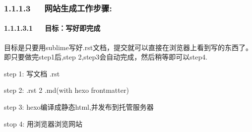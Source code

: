 \documentclass[letterpaper,12pt,english]{sphinxmanual}
\begin{document}
\subsubsection{1.1.1.3   网站生成工作步骤:}
\label{\detokenize{001software/001install/001._u7f51_u7ad9/gitpage:id5}}

\paragraph{1.1.1.3.1   目标：写好即完成}
\label{\detokenize{001software/001install/001._u7f51_u7ad9/gitpage:id6}}
目标是只要用sublime写好.rst文档，提交就可以直接在浏览器上看到写的东西了。即只要做完step1后,step 2,step3会自动完成，然后稍等即可以step4.

\begin{DUlineblock}{0em}
\item[] step 1: 写文档 .rst
\item[] step 2: .rst 2 .md(with hexo frontmatter)
\item[] step 3: hexo编译成静态html,并发布到托管服务器
\item[] stop 4: 用浏览器浏览网站
\end{DUlineblock}
\end{document}
